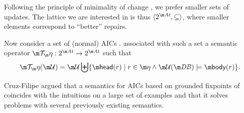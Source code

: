 Following the principle of minimality of change \cite{Winslett90,ai/EiterG92}, we prefer smaller sets of updates. %
The lattice we are interested in is thus $\langle 2^{\atoms}, \subseteq\rangle$, where  smaller elements correspond to ``better'' repairs. 


Now consider a set of (normal) AICs \aics. 
\citet{iclp/Cruz-Filipe16} associated with such a set a semantic operator
$\Op: 2^{\atoms}\to  2^{\atoms}$ such that
\[\Op(\UU) = \UU \biguplus \{\head(r) \mid r\in\aics \land  \UU(\db)\models \body(r)\}.\]

Cruz-Filipe argued that a semantics for AICs based on grounded fixpoints of \Op coincides with the intuitions on a large set of  examples and that it solves problems with several previously existing semantics. 


